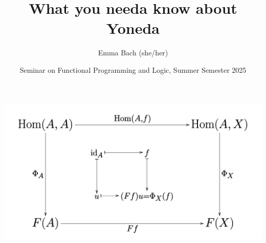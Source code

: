 \documentclass[aspectratio=169]{beamer} %
\title{What you needa know about Yoneda}
\author{Emma Bach (she/her)}
\date{Seminar on Functional Programming and Logic, Summer Semester 2025}
\begin{document}

\begin{frame}[plain]
    \includegraphics[width=0.4\paperwidth]{figures/Yoneda_lemma_cd.svg.png}
    \titlepage
\end{frame}





\end{document}

